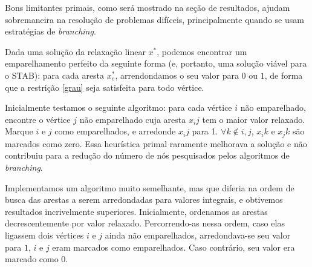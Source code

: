 \documentclass[11pt]{article}
\begin{document}
Bons limitantes primais, como será mostrado na seção de resultados,
ajudam sobremaneira na resolução de problemas difíceis, principalmente
quando se usam estratégias de \emph{branching}.

Dada uma solução da relaxação linear $x^*$, podemos encontrar um
emparelhamento perfeito da seguinte forma (e, portanto, uma solução
viável para o STAB): para cada aresta $x^*_e$, arrendondamos o seu valor
para $0$ ou $1$, de forma que a restrição \eqref{grau} seja satisfeita
para todo vértice. 

Inicialmente testamos o seguinte algoritmo: para cada vértice $i$ não
emparelhado, encontre o vértice $j$ não emparelhado cuja aresta $x_ij$
tem o maior valor relaxado. Marque $i$ e $j$ como emparelhados, e
arredonde $x_ij$ para 1. $\forall k \nin {i,j}$, $x_ik$ e $x_jk$ são
marcados como zero. Essa heurística primal raramente melhorava a
solução e não contribuiu para a redução do número de nós pesquisados
pelos algoritmos de \emph{branching}. 

Implementamos um algoritmo muito semelhante, mas que diferia na ordem de
busca das arestas a serem arredondadas para valores integrais, e
obtivemos resultados incrivelmente superiores. Inicialmente, ordenamos
as arestas decrescentemente por valor relaxado. Percorrendo-as nessa
ordem, caso elas ligassem dois vértices $i$ e $j$ ainda não emparelhados,
arredondava-se seu valor para $1$, $i$ e $j$ eram marcados como
emparelhados. Caso contrário, seu valor era marcado como $0$. 
\end{document}
